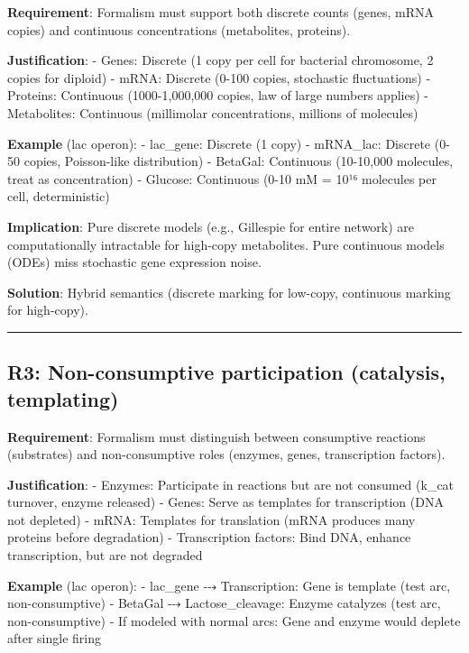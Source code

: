 \textbf{Requirement}: Formalism must support both discrete counts
(genes, mRNA copies) and continuous concentrations (metabolites,
proteins).

\textbf{Justification}: - Genes: Discrete (1 copy per cell for bacterial
chromosome, 2 copies for diploid) - mRNA: Discrete (0-100 copies,
stochastic fluctuations) - Proteins: Continuous (1000-1,000,000 copies,
law of large numbers applies) - Metabolites: Continuous (millimolar
concentrations, millions of molecules)

\textbf{Example} (lac operon): - lac\_gene: Discrete (1 copy) -
mRNA\_lac: Discrete (0-50 copies, Poisson-like distribution) - BetaGal:
Continuous (10-10,000 molecules, treat as concentration) - Glucose:
Continuous (0-10 mM = 10¹⁶ molecules per cell, deterministic)

\textbf{Implication}: Pure discrete models (e.g., Gillespie for entire
network) are computationally intractable for high-copy metabolites. Pure
continuous models (ODEs) miss stochastic gene expression noise.

\textbf{Solution}: Hybrid semantics (discrete marking for low-copy,
continuous marking for high-copy).

\begin{center}\rule{0.5\linewidth}{0.5pt}\end{center}

\hypertarget{r3-non-consumptive-participation-catalysis-templating}{%
\subsection{\texorpdfstring{\textbf{R3: Non-consumptive participation}
(catalysis,
templating)}{R3: Non-consumptive participation (catalysis, templating)}}\label{r3-non-consumptive-participation-catalysis-templating}}

\textbf{Requirement}: Formalism must distinguish between consumptive
reactions (substrates) and non-consumptive roles (enzymes, genes,
transcription factors).

\textbf{Justification}: - Enzymes: Participate in reactions but are not
consumed (k\_cat turnover, enzyme released) - Genes: Serve as templates
for transcription (DNA not depleted) - mRNA: Templates for translation
(mRNA produces many proteins before degradation) - Transcription
factors: Bind DNA, enhance transcription, but are not degraded

\textbf{Example} (lac operon): - lac\_gene ⤏ Transcription: Gene is
template (test arc, non-consumptive) - BetaGal ⤏ Lactose\_cleavage:
Enzyme catalyzes (test arc, non-consumptive) - If modeled with normal
arcs: Gene and enzyme would deplete after single firing \texttimes

